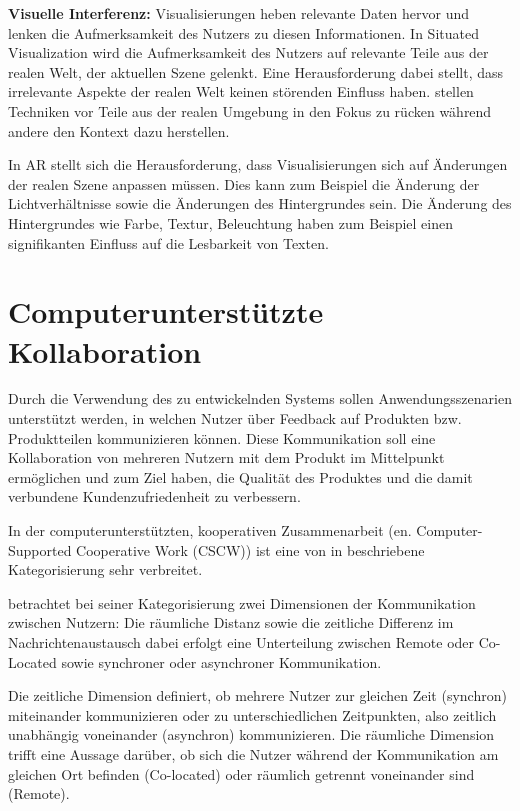 \textbf{Visuelle Interferenz:}
\cite[S.~243]{DieterSchmalstieg2016} Visualisierungen heben relevante Daten hervor und lenken die Aufmerksamkeit des Nutzers zu diesen Informationen. In Situated Visualization 
wird die Aufmerksamkeit des Nutzers auf relevante Teile aus der realen Welt, der aktuellen Szene gelenkt. Eine Herausforderung dabei stellt, dass irrelevante Aspekte der realen Welt 
keinen störenden Einfluss haben. \cite{Kalkofen2007} stellen Techniken vor Teile aus der realen Umgebung in den Fokus zu rücken während andere den Kontext dazu herstellen. 

In AR stellt sich die Herausforderung, dass Visualisierungen sich auf Änderungen der realen Szene anpassen müssen. Dies kann zum Beispiel die Änderung der Lichtverhältnisse sowie die 
Änderungen des Hintergrundes sein. \cite{Gabbard} Die Änderung des Hintergrundes wie Farbe, Textur, Beleuchtung haben zum Beispiel einen signifikanten Einfluss auf die Lesbarkeit von Texten.   

\section{Computerunterstützte Kollaboration}

Durch die Verwendung des zu entwickelnden Systems sollen Anwendungsszenarien unterstützt werden, in welchen Nutzer 
über Feedback auf Produkten bzw. Produktteilen kommunizieren können. Diese Kommunikation soll eine Kollaboration von 
mehreren Nutzern mit dem Produkt im Mittelpunkt ermöglichen und zum Ziel haben, die Qualität des Produktes und die 
damit verbundene Kundenzufriedenheit zu verbessern.     

In der computerunterstützten, kooperativen Zusammenarbeit (en. Computer-Supported Cooperative Work (CSCW)) 
ist eine von \citeauthor{Rodden1992} in \cite[S.~2]{Rodden1992} beschriebene Kategorisierung sehr verbreitet.  


\citeauthor{Rodden1992} betrachtet bei seiner Kategorisierung zwei Dimensionen der Kommunikation zwischen Nutzern: 
Die räumliche Distanz sowie die zeitliche Differenz im Nachrichtenaustausch dabei erfolgt eine Unterteilung zwischen 
Remote oder Co-Located sowie synchroner oder asynchroner Kommunikation.

Die zeitliche Dimension definiert, ob mehrere Nutzer zur gleichen Zeit (synchron) miteinander kommunizieren 
oder zu unterschiedlichen Zeitpunkten, also zeitlich unabhängig voneinander (asynchron) kommunizieren. Die räumliche Dimension trifft eine Aussage darüber, ob sich die Nutzer während der Kommunikation am gleichen Ort befinden (Co-located) oder räumlich getrennt voneinander sind (Remote). 

